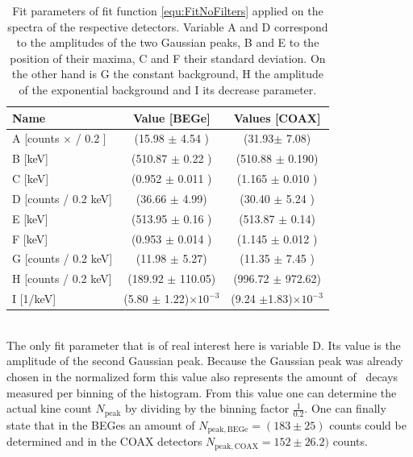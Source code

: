 \documentclass[encoding=utf8,british]{tumphthesis}
\begin{document}
\begin{table}[t!]
\centering
\begin{tabular}{|l|c|c|}
\hline
Name	& Value [BEGe] & Values [COAX]\\ 
\hline
A [counts $\times$ / 0.2 ] &	(15.98 \(\pm\)	4.54	)&	(31.93\(\pm\)	7.08)	\\	
\hline
B [keV] &	(510.87 \(\pm\)	0.22	)&	(510.88 \(\pm\)	0.190)\\	
\hline
C [keV] &	(0.952 \(\pm\)	0.011	)	&	(1.165 \(\pm\)	0.010	)	\\
\hline
D [counts / 0.2 keV] &	(36.66 \(\pm\)	4.99)	&	(30.40 \(\pm\)	5.24	)	\\
\hline
E [keV] &	(513.95 \(\pm\)	0.16	)	&	(513.87 \(\pm\)	0.14)	\\
\hline
F [keV] &	(0.953 \(\pm\)	0.014	)	&	(1.145 \(\pm\)	0.012	)	\\
\hline
G [counts / 0.2 keV] &	(11.98 \(\pm\)	5.27)	&	(11.35 \(\pm\)	7.45	)	\\
\hline
H [counts / 0.2 keV] &	(189.92 \(\pm\)	110.05)	&	(996.72 \(\pm\)	972.62)	\\
\hline
I [1/keV] &	(5.80 \(\pm\) 1.22)$\times10^{-3}$	&	(9.24 \(\pm\)1.83)$\times10^{-3}$ \\
\hline

\end{tabular}
\label{tab:FitParNoFilter}
\caption{
	Fit parameters of fit function \ref{equ:FitNoFilters} applied on the spectra of the respective detectors. 
	Variable A and D correspond to the amplitudes of the two Gaussian peaks, B and E to the position of their maxima, C and F their standard deviation. 
	On the other hand is G the constant background, H the amplitude of the exponential background and I its decrease parameter.
	}
\end{table}
\\

The only fit parameter that is of real interest here is variable D.
Its value is the amplitude of the second Gaussian peak.
Because the Gaussian peak was already chosen in the normalized form this value also represents the amount of \Kr\ decays measured per binning of the histogram.
From this value one can determine the actual kine count $N_{\mathrm{peak}}$ by dividing by the binning factor $\frac{1}{0.2 }$.
One can finally state that in the BEGes an amount of $N_{\mathrm{peak,BEGe}} = (183\pm25)$ counts could be determined and in the COAX detectors $N_{\mathrm{peak,COAX}} = 152\pm26.2)$ counts.
\\
\end{document}
